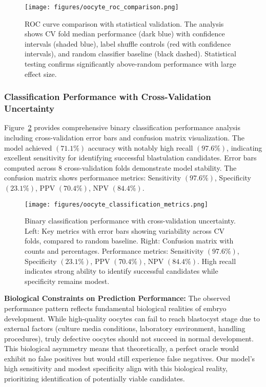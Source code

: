 \documentclass[pdflatex,sn-basic]{sn-jnl}%
\begin{document}
\begin{figure}[H]
    \centering
    \texttt{[image: figures/oocyte\_roc\_comparison.png]}
    \caption{ROC curve comparison with statistical validation. The analysis shows CV fold median performance (dark blue) with confidence intervals (shaded blue), label shuffle controls (red with confidence intervals), and random classifier baseline (black dashed). Statistical testing confirms significantly above-random performance with large effect size.}
    \label{fig:oocyte_roc}
\end{figure}

\subsubsection{Classification Performance with Cross-Validation Uncertainty}

Figure~\ref{fig:oocyte_metrics} provides comprehensive binary classification performance analysis including cross-validation error bars and confusion matrix visualization. The model achieved $(71.1\%)$ accuracy with notably high recall $(97.6\%)$, indicating excellent sensitivity for identifying successful blastulation candidates. Error bars computed across 8 cross-validation folds demonstrate model stability. The confusion matrix shows performance metrics: Sensitivity $(97.6\%)$, Specificity $(23.1\%)$, PPV $(70.4\%)$, NPV $(84.4\%)$.

\begin{figure}[H]
    \centering
    \texttt{[image: figures/oocyte\_classification\_metrics.png]}
    \caption{Binary classification performance with cross-validation uncertainty. Left: Key metrics with error bars showing variability across CV folds, compared to random baseline. Right: Confusion matrix with counts and percentages. Performance metrics: Sensitivity $(97.6\%)$, Specificity $(23.1\%)$, PPV $(70.4\%)$, NPV $(84.4\%)$. High recall indicates strong ability to identify successful candidates while specificity remains modest.}
    \label{fig:oocyte_metrics}
\end{figure}

\textbf{Biological Constraints on Prediction Performance:} The observed performance pattern reflects fundamental biological realities of embryo development. While high-quality oocytes can fail to reach blastocyst stage due to external factors (culture media conditions, laboratory environment, handling procedures), truly defective oocytes should not succeed in normal development. This biological asymmetry means that theoretically, a perfect oracle would exhibit no false positives but would still experience false negatives. Our model's high sensitivity and modest specificity align with this biological reality, prioritizing identification of potentially viable candidates.
\end{document}
